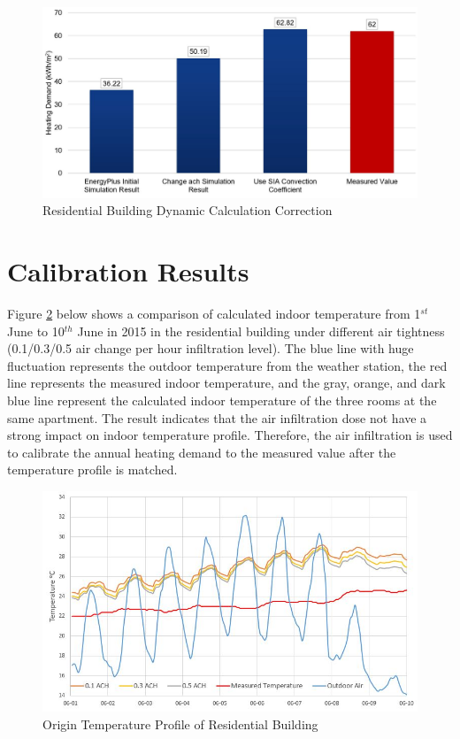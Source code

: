 \documentclass[a4paper, oneside]{discothesis}
\begin{document}
		\begin{figure}[htbp]
		\centering
		\includegraphics[scale=0.4]{Residential_EP.jpg}
		\caption{Residential Building Dynamic Calculation Correction}
		\label{fig:Hongger_EP}
		\end{figure}
		
		




	\section{Calibration Results}

			Figure \ref{fig:ACH_Compare} below shows a comparison of calculated indoor temperature from 1$^{st}$ June to 10$^{th}$ June in 2015 in the residential building under different air tightness (0.1/0.3/0.5 air change per hour infiltration level). The blue line with huge fluctuation represents the outdoor temperature from the weather station, the red line represents the measured indoor temperature, and the gray, orange, and dark blue line represent the calculated indoor temperature of the three rooms at the same apartment. The result indicates that the air infiltration dose not have a strong impact on indoor temperature profile. Therefore, the air infiltration is used to calibrate the annual heating demand to the measured value after the temperature profile is matched.\\
		
			\begin{figure}[H]
			\centering
			\includegraphics[scale=0.7]{ACH_Compare.JPG}
			\caption{Origin Temperature Profile of Residential Building}
			\label{fig:ACH_Compare}
			\end{figure}
\end{document}
